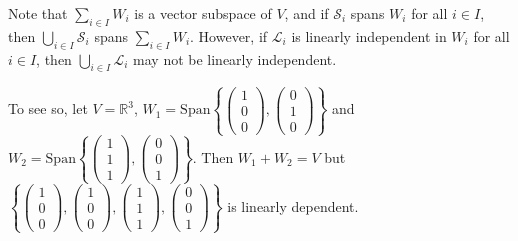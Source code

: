 \documentclass[11pt,openany]{book}
\theoremstyle{plain}
\theoremstyle{definition}
\theoremstyle{remark}
\begin{document}
Note that $\sum_{i \in I} W_i$ is a vector subspace of $V$, and if $\mathcal{S}_i$ spans $W_i$ for all $i \in I$, then $\bigcup_{i \in I} \mathcal{S}_i$ spans $\sum_{i \in I} W_i$. However, if $\mathcal{L}_i$ is linearly independent in $W_i$ for all $i \in I$, then $\bigcup_{i \in I} \mathcal{L}_i$ may not be linearly independent.

To see so, let $V = \mathbb{R}^3$, $W_1 = \mathrm{Span}\left\{\begin{pmatrix} 1\\ 0\\0 \end{pmatrix}, \begin{pmatrix} 0\\ 1\\0 \end{pmatrix}\right\}$ and $W_2 = \mathrm{Span}\left\{\begin{pmatrix} 1\\ 1\\1 \end{pmatrix}, \begin{pmatrix} 0\\ 0\\1 \end{pmatrix}\right\}$. Then
$W_1 + W_2 = V$
but $\left\{\begin{pmatrix} 1\\ 0\\0 \end{pmatrix}, \begin{pmatrix} 1\\ 0\\0 \end{pmatrix}, \begin{pmatrix} 1\\ 1\\1 \end{pmatrix}, \begin{pmatrix} 0\\ 0\\1 \end{pmatrix}\right\}$ is linearly dependent.
\end{document}
